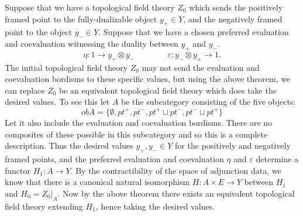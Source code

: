 \documentclass{amsart}
\begin{document}
\begin{example}
	Suppose that we have a topological field theory $Z_0$ which sends the positively framed point to the fully-dualizable object $y_+ \in Y$, and the negatively framed point to the object $y_- \in Y$. Suppose that we have a chosen preferred evaluation and coevaluation witnessing the duality between $y_+$ and $y_-$. 
\begin{equation*}
	\eta: 1 \to y_+ \otimes y_- \qquad \qquad \varepsilon: y_- \otimes y_+ \to 1.
\end{equation*}	
	The initial topological field theory $Z_0$ may not send the evaluation and coevaluation bordisms to these specific values, but using the above theorem, we can replace $Z_0$ be an equivalent topological field theory which does take the desired values. To see this let $A$ be the subcategory consisting of the five objects:
	\begin{equation*}
		ob A = \{ \emptyset, pt^+, pt^-, pt^+ \sqcup pt^-, pt^- \sqcup pt^+ \}
	\end{equation*}
	Let it also include the evaluation and coevaluation bordisms. There are no composites of these possible in this subcategory and so this is a complete description. Thus the desired values $y_+, y_- \in Y$ for the positively and negatively framed points, and the preferred evaluation and coevaluation $\eta$ and $\varepsilon$ determine a functor $H_1: A \to Y$. By the contractibility of the space of adjunction data, we know that there is a canonical natural isomorphism $H: A \times E \to Y$ between $H_1$ and $H_0 = Z_0|_A$. Now by the above theorem there exists an equivalent topological field theory extending $H_1$, hence taking the desired values. 
\end{example}

%	 
%	
\end{document}
